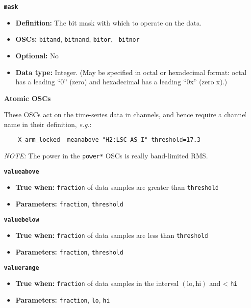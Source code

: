 \documentclass[11pt]{article}
\begin{document}
{\large\texttt{\textbf{mask}}}
\begin{itemize}
\item \textbf{Definition:} The bit mask with which to operate on the
  data.
\item \textbf{OSCs:} \texttt{bitand}, \texttt{bitnand}, \texttt{bitor}, \texttt{
    bitnor}
\item \textbf{Optional:} No
\item \textbf{Data type:} Integer. (May be specified in octal or
  hexadecimal format: octal has a leading ``0'' (zero) and hexadecimal
  has a leading ``0x'' (zero x).)
\end{itemize}


\begin{center}
  \textbf{Atomic OSCs}
\end{center}

These OSCs act on the time-series data in channels, and hence require
a channel name in their definition, \textit{e.g.}:

\begin{verbatim}
    X_arm_locked  meanabove "H2:LSC-AS_I" threshold=17.3
\end{verbatim}

\textit{NOTE:} The power in the \texttt{power*} OSCs is really
band-limited RMS.


{\large\texttt{\textbf{valueabove}}}

\begin{itemize}
\item \textbf{True when:} \texttt{fraction} of data samples are greater than
  \texttt{threshold}
\item \textbf{Parameters:} \texttt{fraction}, \texttt{threshold}
\end{itemize}


{\large\texttt{\textbf{valuebelow}}}

\begin{itemize}
\item \textbf{True when:} \texttt{fraction} of data samples are less than
  \texttt{threshold}
\item \textbf{Parameters:} \texttt{fraction}, \texttt{threshold}
\end{itemize}


{\large\texttt{\textbf{valuerange}}}

\begin{itemize}
\item \textbf{True when:} \texttt{fraction} of data samples in the interval 
  $(\mathrm{lo}, \mathrm{hi})$
  and < \texttt{hi}
\item \textbf{Parameters:} \texttt{fraction}, \texttt{lo}, \texttt{hi}
\end{itemize}
\end{document}
